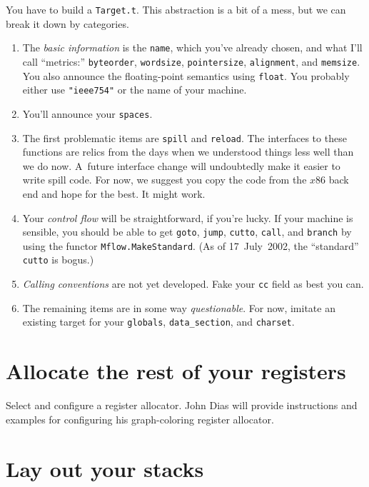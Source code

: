 \documentclass[12pt]{article}
\begin{document}
You have to build a \texttt{Target.t}.
This abstraction is a bit of a mess, but we can break it down by
categories. 
\begin{enumerate} 
\item
The \emph{basic information} is the \texttt{name}, which you've already
chosen, and what I'll call ``metrics:''
\texttt{byteorder}, \texttt{wordsize}, \texttt{pointersize},
\texttt{alignment}, and \texttt{memsize}.
You also announce the floating-point semantics using \texttt{float}.
You probably either use \texttt{"ieee754"} or the name of your
machine. 
\item
You'll announce your \texttt{spaces}.
\item
The first problematic items are \texttt{spill} and \texttt{reload}.
The interfaces to these functions are relics from the days when we
understood things less well than we do now.
A~future interface change will undoubtedly make it easier to write
spill code.
For now, we suggest you copy the code from the $x$86 back end and hope
for the best.
It might work.
\item
Your \emph{control flow} will be straightforward, if you're lucky.
If your machine is sensible, 
you should be able to get \texttt{goto}, \texttt{jump},
\texttt{cutto}, \texttt{call}, and \texttt{branch} by using the functor
\texttt{Mflow.MakeStandard}. 
(As of 17~July~2002, the ``standard'' \texttt{cutto} is bogus.)
\item
\emph{Calling conventions} are not yet developed.
Fake your \texttt{cc} field as best you can.
\item
The remaining items are in some way \emph{questionable}.
For now, imitate an existing target for your \texttt{globals},
\texttt{data\_section}, and \texttt{charset}.
\end{enumerate}


\section{Allocate the rest of your registers}

Select and configure a register allocator.
John Dias will provide instructions and examples for configuring his
graph-coloring register allocator.

\section{Lay out your stacks}
\end{document}
